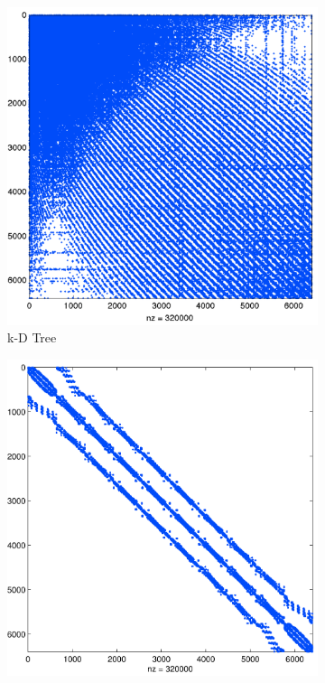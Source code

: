 \begin{figure}
\centering
\begin{subfigure}{0.425\textwidth}
\includegraphics[width=1.0\textwidth]{figures/chapter7/bruteforce_N6400_n50-eps-converted-to.png}
\caption{k-D Tree} 
\end{subfigure} 
\begin{subfigure}{0.425\textwidth}
\includegraphics[width=1.0\textwidth]{figures/chapter7/lsh_N6400_n50-eps-converted-to.png}

\end{subfigure}
\end{figure}
